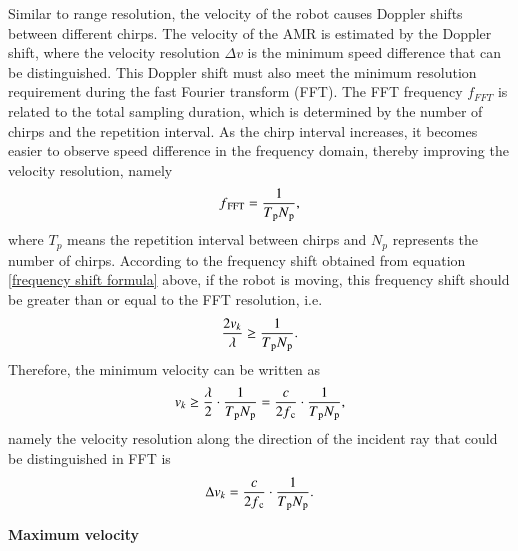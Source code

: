 \documentclass[12pt,DIV14,BCOR12mm,a4paper,footinclude=false,headinclude,parskip=half-,twoside,openright,cleardoublepage=empty,toc=index,bibliography=totoc,listof=totoc]{scrreprt}
\numberwithin{equation}{chapter}
\begin{document}
Similar to range resolution, the velocity of the robot causes Doppler shifts between different chirps. The velocity of the AMR is estimated by the Doppler shift, where the velocity resolution $\Delta v$ is the minimum speed difference that can be distinguished. This Doppler shift must also meet the minimum resolution requirement during the fast Fourier transform (FFT). The FFT frequency $f_{FFT}$ is related to the total sampling duration, which is determined by the number of chirps and the repetition interval. As the chirp interval increases, it becomes easier to observe speed difference in the frequency domain, thereby improving the velocity resolution, namely
\begin{equation}
    \centering
    f\textsubscript{FFT} = \frac{1}{T\textsubscript{p} N\textsubscript{p}},
\end{equation}
where $T_p$ means the repetition interval between chirps and $N_p$ represents the number of chirps. According to the frequency shift obtained from equation \ref{frequency shift formula} above, if the robot is moving, this frequency shift should be greater than or equal to the FFT resolution, i.e.
\begin{equation}
    \centering
    \frac{2v_k}{\lambda} \geq \frac{1}{T\textsubscript{p} N\textsubscript{p}}.
\end{equation}
Therefore, the minimum velocity can be written as
\begin{equation}
    \centering
    v_k \geq \frac{\lambda}{2} \cdot \frac{1}{T\textsubscript{p} N\textsubscript{p}} = \frac{c}{2f\textsubscript{c}} \cdot \frac{1}{T\textsubscript{p} N\textsubscript{p}},
\end{equation}
namely the velocity resolution along the direction of the incident ray that could be distinguished in FFT is
\begin{equation}
    \centering
    \Delta v_k = \frac{c}{2f\textsubscript{c}} \cdot \frac{1}{T\textsubscript{p} N\textsubscript{p}}.
    \label{velocity resolution formula}
\end{equation}

\begin{spacing}{1.5}
\textbf{\large{Maximum velocity}}
\end{spacing}
\end{document}
